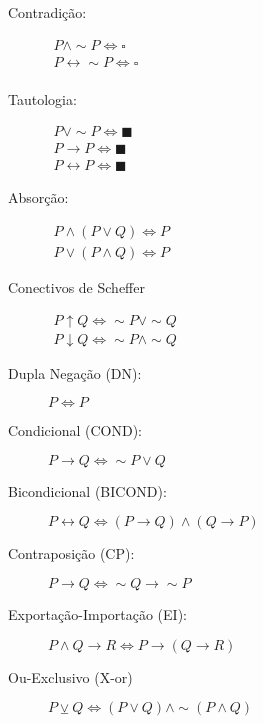 \documentclass[12pt, a4paper,final]{article}
\begin{document}
\begin{description}
        \item[Contradição:] $\begin{array}{l} P\wedge \sim P \Leftrightarrow \square \\ P \leftrightarrow \sim P \Leftrightarrow \square \\ \end{array}$
        
        \item[Tautologia:] $ \begin{array}{l} P\vee \sim P \Leftrightarrow \blacksquare \\ P \rightarrow P \Leftrightarrow \blacksquare \\ P \leftrightarrow P \Leftrightarrow \blacksquare \end{array}$
        
        \item [Absorção:] $\begin{array}{l}P \wedge (P \vee Q) \Leftrightarrow P\\P \vee (P \wedge Q) \Leftrightarrow P\end{array}$
        
        \item[Conectivos de Scheffer] $\begin{array}{l} P \uparrow Q \Leftrightarrow \sim P \vee \sim Q \\  P \downarrow Q \Leftrightarrow \sim P \wedge \sim Q \end{array}$
        
        \item[Dupla Negação (DN):] $P\Leftrightarrow  P$ 
        
        \item[Condicional (COND):] $P\rightarrow Q \Leftrightarrow\sim P \vee Q$
        
        \item[Bicondicional (BICOND):] $P\leftrightarrow Q \Leftrightarrow (P\rightarrow Q)\wedge(Q\rightarrow P)$
        
        \item[Contraposição (CP):] $P\rightarrow Q \Leftrightarrow \sim Q\rightarrow\sim P$
        
        \item[Exportação-Importação (EI):] $P\wedge Q\rightarrow R \Leftrightarrow P\rightarrow(Q\rightarrow R)$
        
        \item[Ou-Exclusivo (X-or)] $P \veebar Q \Leftrightarrow (P \vee Q) \wedge \sim (P \wedge Q)$
        
    \end{description}
    
\end{document}
